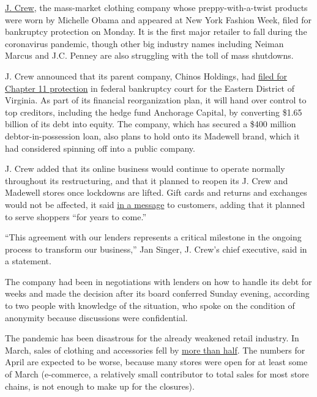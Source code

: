 \href{https://www.nytimes3xbfgragh.onion/2020/05/14/business/coronavirus-retail-bankruptcies-private-equity.html}{J.
Crew}, the mass-market clothing company whose preppy-with-a-twist
products were worn by Michelle Obama and appeared at New York Fashion
Week, filed for bankruptcy protection on Monday. It is the first major
retailer to fall during the coronavirus pandemic, though other big
industry names including Neiman Marcus and J.C. Penney are also
struggling with the toll of mass shutdowns.

J. Crew announced that its parent company, Chinos Holdings, had
\href{https://jcrewgrouprestructuring.com/our-announcement/}{filed for
Chapter 11 protection} in federal bankruptcy court for the Eastern
District of Virginia. As part of its financial reorganization plan, it
will hand over control to top creditors, including the hedge fund
Anchorage Capital, by converting \$1.65 billion of its debt into equity.
The company, which has secured a \$400 million debtor-in-possession
loan, also plans to hold onto its Madewell brand, which it had
considered spinning off into a public company.

J. Crew added that its online business would continue to operate
normally throughout its restructuring, and that it planned to reopen its
J. Crew and Madewell stores once lockdowns are lifted. Gift cards and
returns and exchanges would not be affected, it said
\href{https://jcrewgrouprestructuring.com/message-to-our-customers/}{in
a message} to customers, adding that it planned to serve shoppers ``for
years to come.''

``This agreement with our lenders represents a critical milestone in the
ongoing process to transform our business,'' Jan Singer, J. Crew's chief
executive, said in a statement.

The company had been in negotiations with lenders on how to handle its
debt for weeks and made the decision after its board conferred Sunday
evening, according to two people with knowledge of the situation, who
spoke on the condition of anonymity because discussions were
confidential.

The pandemic has been disastrous for the already weakened retail
industry. In March, sales of clothing and accessories fell by
\href{https://www.nytimes3xbfgragh.onion/2020/04/15/business/economy/coronavirus-retail-sales.html?searchResultPosition=1}{more
than half}. The numbers for April are expected to be worse, because many
stores were open for at least some of March (e-commerce, a relatively
small contributor to total sales for most store chains, is not enough to
make up for the closures).

